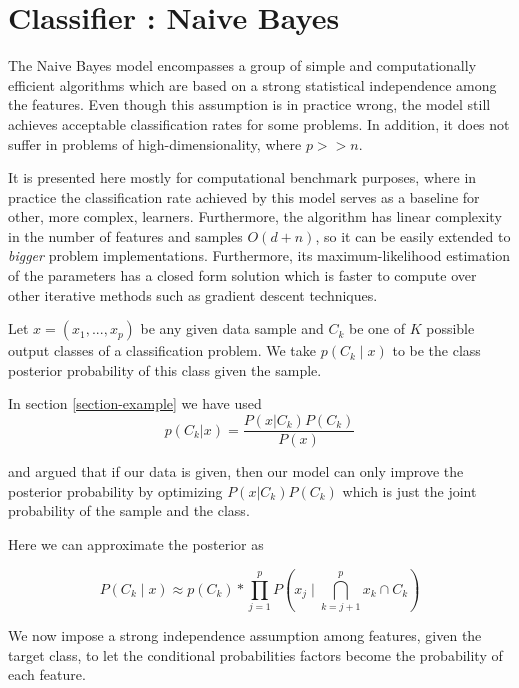 \section{Classifier : Naive Bayes}

The Naive Bayes model encompasses a group of simple and computationally efficient algorithms which are based on a strong statistical independence among the features. Even though this assumption is in practice wrong, the model still achieves acceptable classification rates for some problems. In addition, it does not suffer in problems of high-dimensionality, where $p >> n$.

It is presented here mostly for computational benchmark purposes, where in practice the classification rate achieved by this model serves as a baseline for other, more complex, learners. Furthermore, the algorithm has linear  complexity in the number of features and samples $O(d+n)$, so it can be easily extended to \textit{bigger} problem implementations. Furthermore, its maximum-likelihood estimation of the parameters has a closed form solution which is faster to compute over other iterative methods such as gradient descent techniques.

Let $x = (x_1,...,x_p)$ be any given data sample and $C_k$ be one of $K$ possible output classes of a classification problem. We take $p(C_k \mid x)$  to be the  class posterior probability of this class given the sample.

In section \ref{section-example}
we have used
\begin{equation}
p(C_k| x) = \frac{P(x|C_k)P(C_k)}{P(x)}
\end{equation}
\label{equation-posteriorProbabilties}

and argued that if our data is given, then our model can only improve the posterior probability by optimizing $P(x|C_k)P(C_k)$ which is just the joint probability of the sample and the class.

Here we can approximate the posterior as

\begin{equation}
P(C_k \mid x) \approx p(C_k) * \prod_{j=1}^{p}    P(x_j \mid \bigcap_{k=j+1}^{p} x_k \cap C_k)
\end{equation}
\label{equation-posteriorProbabilityDecomposition1}

We now impose a strong independence assumption among features, given the target class, to let the conditional probabilities factors become the probability of each feature. %

